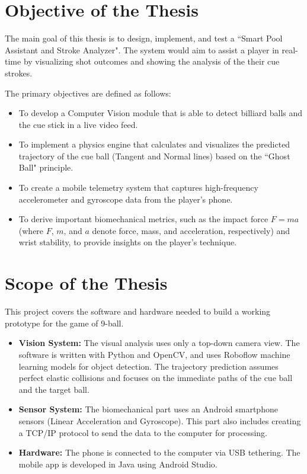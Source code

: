 \section{Objective of the Thesis}

The main goal of this thesis is to design, implement, and test a ``Smart Pool Assistant and Stroke Analyzer". The system would aim to assist a player in real-time by visualizing shot outcomes and showing the analysis of the their cue strokes.

The primary objectives are defined as follows:
\begin{itemize}
    \item To develop a Computer Vision module that is able to detect billiard balls and the cue stick in a live video feed.
    \item To implement a physics engine that calculates and visualizes the predicted trajectory of the cue ball (Tangent and Normal lines) based on the ``Ghost Ball" principle.
    \item To create a mobile telemetry system that captures high-frequency accelerometer and gyroscope data from the player's phone.
    \item To derive important biomechanical metrics, such as the impact force $F=ma$ (where $F$, $m$, and $a$ denote force, mass, and acceleration, respectively) and wrist stability, to provide insights on the player's technique.
\end{itemize}

\section{Scope of the Thesis}

This project covers the software and hardware needed to build a working prototype for the game of 9-ball.

\begin{itemize}
    \item \textbf{Vision System:} The visual analysis uses only a top-down camera view. The software is written with Python and OpenCV, and uses Roboflow machine learning models for object detection. The trajectory prediction assumes perfect elastic collisions and focuses on the immediate paths of the cue ball and the target ball.
    \item \textbf{Sensor System:} The biomechanical part uses an Android smartphone sensors (Linear Acceleration and Gyroscope). This part also includes creating a TCP/IP protocol to send the data to the computer for processing.
    \item \textbf{Hardware:} The phone is connected to the computer via USB tethering. The mobile app is developed in Java using Android Studio. 
\end{itemize}

